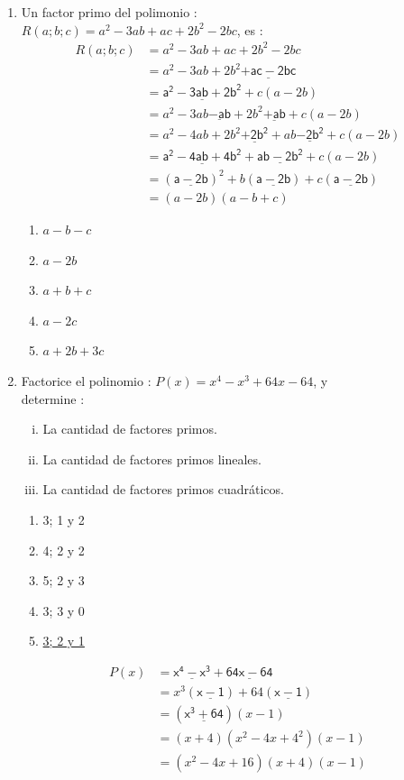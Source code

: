 \documentclass{article}
\begin{document}
\begin{enumerate}
\item{Un factor primo del polimonio : \\ $R(a;b;c) = a^2 - 3ab + ac + 2b^2 - 2bc$, es : 
\begin{align*}
R(a;b;c) & = a^2 - 3ab + ac + 2b^2 - 2bc \\ %
& = a^2 - 3ab + 2b^2 \underline{\mathsf{+ ac - 2bc}} \\ %
& = \underline{\mathsf{a^2 - 3ab + 2b^2}} + c(a - 2b) \\
& = a^2 - 3ab \underline{\mathsf{- ab}} + 2b^2 \underline{\mathsf{+ ab}} + c(a - 2b) \\
& = a^2 - 4ab + 2b^2 \underline{\mathsf{+ 2b^2}} + ab \underline{\mathsf{- 2b^2}} + c(a - 2b) \\
& = \underline{\mathsf{a^2 - 4ab + 4b^2}} + \underline{\mathsf{ab - 2b^2}} + c(a - 2b) \\
& = (\underline{\mathsf{a - 2b}})^2 + b(\underline{\mathsf{a - 2b}}) + c(\underline{\mathsf{a - 2b}}) \\
& = (a - 2b)(a - b + c)   
\end{align*}
\begin{enumerate}
\item{$a - b - c$}
\item{\underline{$a - 2b$}}
\item{$a + b + c$}
\item{$a - 2c$}
\item{$a + 2b + 3c$}
\end{enumerate}
}

\item{Factorice el polinomio : $P(x) = x^4 - x^3 + 64x - 64$, y \\ determine :
\begin{enumerate}[i)]
\item{La cantidad de factores primos.}
\item{La cantidad de factores primos lineales.}
\item{La cantidad de factores primos cuadr\'aticos.}
\end{enumerate}
\begin{enumerate}
\item{3; 1 y 2}
\item{4; 2 y 2}
\item{5; 2 y 3}
\item{3; 3 y 0}
\item{\underline{3; 2 y 1}}
\end{enumerate}
\begin{align*}
P(x) & = \underline{\mathsf{x^4 - x^3}} + \underline{\mathsf{64x - 64}} \\
& = x^3(\underline{\mathsf{x - 1}}) + 64(\underline{\mathsf{x - 1}}) \\
& = (\underline{\mathsf{x^3 + 64}})(x - 1) \\
& = (x + 4)(x^2 - 4x + 4^2)(x - 1) \\
& = (x^2 - 4x + 16)(x + 4)(x - 1)
\end{align*}
}


\end{enumerate}
\end{document}
